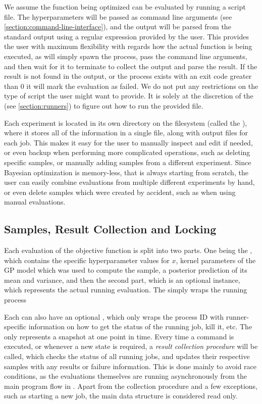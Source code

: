 We assume the function being optimized can be evaluated by running a script file. The hyperparameters will be passed as command line arguments (see \autoref{section:command-line-interface}), and the output will be parsed from the standard output using a regular expression provided by the user. This provides the user with maximum flexibility with regards how the actual function is being executed, as \bopt will simply spawn the process, pass the command line arguments, and then wait for it to terminate to collect the output and parse the result. If the result is not found in the output, or the process exists with an exit code greater than $0$ it will mark the evaluation as failed. We do not put any restrictions on the type of script the user might want to provide. It is solely at the discretion of the  (see \autoref{section:runners}) to figure out how to run the provided file.

Each \bopt experiment is located in its own directory on the filesystem (called the ), where it stores all of the information in a single  file, along with output files for each job. This makes it easy for the user to manually inspect and edit if needed, or even backup when performing more complicated operations, such as deleting specific samples, or manually adding samples from a different experiment. Since Bayesian optimization is memory-less, that is always starting from scratch, the user can easily combine evaluations from multiple different experiments by hand, or even delete samples which were created by accident, such as when using manual evaluations.


\subsection{Samples, Result Collection and Locking}

Each evaluation of the objective function is split into two parts. One being the , which contains the specific hyperparameter values for $x$, kernel parameters of the GP model which was used to compute the sample, a posterior prediction of its mean and variance, and then the second part, which is an optional  instance, which represents the actual running evaluation. The  simply wraps the running process 

Each  can also have an optional , which only wraps the process ID with runner-specific information on how to get the status of the running job, kill it, etc. The  only represents a snapshot at one point in time. Every time a \bopt command is executed, or whenever a new state is required, a \emph{result collection procedure} will be called, which checks the status of all running jobs, and updates their respective samples with any results or failure information. This is done mainly to avoid race conditions, as the evaluations themselves are running asynchronously from the main program flow in \bopt. Apart from the collection procedure and a few exceptions, such as starting a new job, the main data structure is considered read only.

